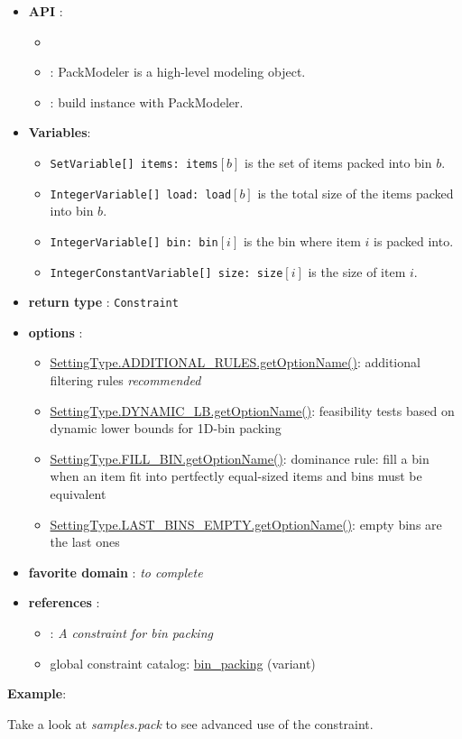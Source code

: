 \begin{itemize}
	\item \textbf{API} :
	\begin{itemize}
		\item {}
		\item {}: PackModeler is a high-level modeling object.
		\item {}: build instance with PackModeler.
	\end{itemize}
	\item \textbf{Variables}:
	\begin{itemize}
		\item \texttt{SetVariable[] items: items}$[b]$ is the set of items packed into bin $b$.
		\item \texttt{IntegerVariable[] load: load}$[b]$ is the total size of the items packed into bin $b$.
		\item \texttt{IntegerVariable[] bin: bin}$[i]$ is the bin where item $i$ is packed into.
		\item \texttt{IntegerConstantVariable[] size: size}$[i]$ is the size of item $i$.
	\end{itemize}
	\item \textbf{return type} : \texttt{Constraint}
	\item \textbf{options} : 	
      \begin{itemize}
      \item \hyperlink{cpackar:cpackaroptions}{SettingType.ADDITIONAL\_RULES.getOptionName()}: additional filtering rules \emph{recommended}
      \item \hyperlink{cpackdlb:cpackdlboptions}{SettingType.DYNAMIC\_LB.getOptionName()}: feasibility tests based on dynamic lower bounds for 1D-bin packing
      \item \hyperlink{cpackfill:cpackfilloptions}{SettingType.FILL\_BIN.getOptionName()}: dominance rule: fill a bin when an item fit into pertfectly equal-sized items and bins must be equivalent
      \item \hyperlink{cpacklbe:cpacklbeoptions}{SettingType.LAST\_BINS\_EMPTY.getOptionName()}: empty bins are the last ones 
      \end{itemize}
	\item \textbf{favorite domain} : \emph{to complete}
	\item \textbf{references} :
      \begin{itemize}
      \item \cite{ShawCP04}: \emph{A constraint for bin packing}
      \item global constraint catalog: \href{http://www.emn.fr/x-info/sdemasse/gccat/Cbin_packing.html}{bin\_packing} (variant)
      \end{itemize}
\end{itemize}

\textbf{Example}:

Take a look at \emph{samples.pack} to see advanced use of the constraint.


